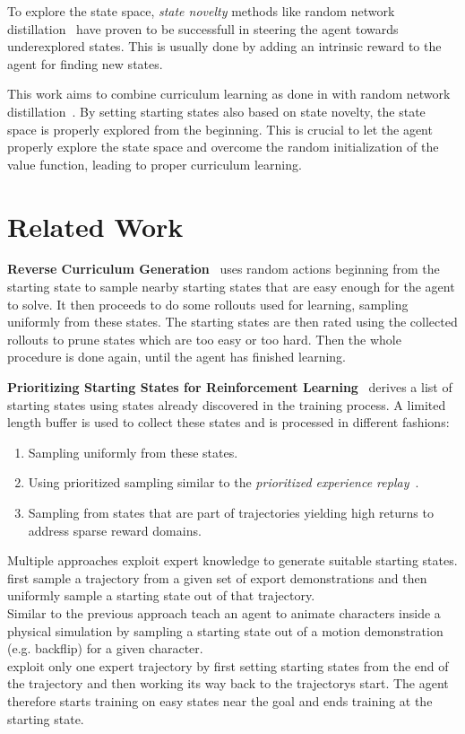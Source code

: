 \documentclass{article}
\begin{document}
To explore the state space, \textit{state novelty} methods like random network distillation~\citep{rnd} have proven to be successfull in steering the agent towards underexplored states. This is usually done by adding an intrinsic reward to the agent for finding new states.

This work aims to combine curriculum learning as done in \cite{prox_curr} with random network distillation~\citep{rnd}. By setting starting states also based on state novelty, the state space is properly explored from the beginning. This is crucial to let the agent properly explore the state space and overcome the random initialization of the value function, leading to proper curriculum learning.

\section{Related Work}


\textbf{Reverse Curriculum Generation}~\citep{reverse_curr_gen} uses random actions beginning from the starting state to sample nearby starting states that are easy enough for the agent to solve. It then proceeds to do some rollouts used for learning, sampling uniformly from these states. The starting states are then rated using the collected rollouts to prune states which are too easy or too hard. Then the whole procedure is done again, until the agent has finished learning.

\textbf{Prioritizing Starting States for Reinforcement Learning}~\citep{prio_start_states} derives a list of starting states using states already discovered in the training process. A limited length buffer is used to collect these states and is processed in different fashions:
\begin{enumerate}
  \item Sampling uniformly from these states.
  \item Using prioritized sampling similar to the \textit{prioritized experience replay}~\citep{prio_exp_replay}.
  \item Sampling from states that are part of trajectories yielding high returns to address sparse reward domains.
\end{enumerate}


Multiple approaches exploit expert knowledge to generate suitable starting states. \\
\cite{overcoming_exploration} first sample a trajectory from a given set of export demonstrations and then uniformly sample a starting state out of that trajectory. \\
Similar to the previous approach \cite{deepmimic} teach an agent to animate characters inside a physical simulation by sampling a starting state out of a motion demonstration (e.g. backflip) for a given character. \\
\cite{montezuma_demonstration} exploit only one expert trajectory by first setting starting states from the end of the trajectory and then working its way back to the trajectorys start. The agent therefore starts training on easy states near the goal and ends training at the starting state.
\end{document}
